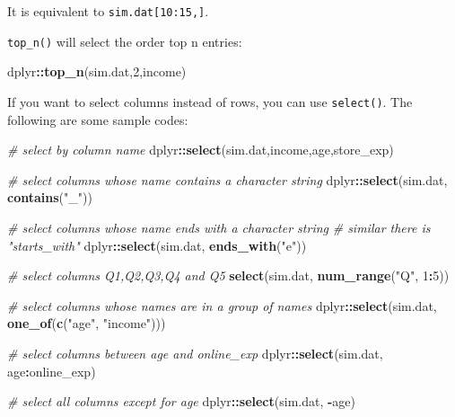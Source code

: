 \documentclass[12pt,]{krantz}
\makeatletter
\newenvironment{Shaded}{\begin{snugshade}}{\end{snugshade}}
\newcommand{\CommentTok}[1]{\textcolor[rgb]{0.37,0.37,0.37}{\textit{#1}}}
\newcommand{\DecValTok}[1]{\textcolor[rgb]{0.06,0.06,0.06}{#1}}
\newcommand{\KeywordTok}[1]{\textcolor[rgb]{0.27,0.27,0.27}{\textbf{#1}}}
\newcommand{\NormalTok}[1]{#1}
\newcommand{\OperatorTok}[1]{\textcolor[rgb]{0.43,0.43,0.43}{\textbf{#1}}}
\newcommand{\StringTok}[1]{\textcolor[rgb]{0.5,0.5,0.5}{#1}}
\newenvironment{kframe}{%
\medskip{}
\setlength{\fboxsep}{.8em}
 \def\at@end@of@kframe{}%
 \ifinner\ifhmode%
  \def\at@end@of@kframe{\end{minipage}}%
  \begin{minipage}{\columnwidth}%
 \fi\fi%
 \def\FrameCommand##1{\hskip\@totalleftmargin \hskip-\fboxsep
 \colorbox{shadecolor}{##1}\hskip-\fboxsep
     \hskip-\linewidth \hskip-\@totalleftmargin \hskip\columnwidth}%
 \MakeFramed {\advance\hsize-\width
   \@totalleftmargin\z@ \linewidth\hsize
   \@setminipage}}%
 {\par\unskip\endMakeFramed%
 \at@end@of@kframe}
\renewenvironment{Shaded}{\begin{kframe}}{\end{kframe}}
\makeatother
\begin{document}
It is equivalent to \texttt{sim.dat{[}10:15,{]}}.

\texttt{top\_n()} will select the order top n entries:

\begin{Shaded}
\begin{Highlighting}[]
\NormalTok{dplyr}\OperatorTok{::}\KeywordTok{top_n}\NormalTok{(sim.dat,}\DecValTok{2}\NormalTok{,income)}
\end{Highlighting}
\end{Shaded}

If you want to select columns instead of rows, you can use \texttt{select()}. The following are some sample codes:

\begin{Shaded}
\begin{Highlighting}[]
\CommentTok{# select by column name}
\NormalTok{dplyr}\OperatorTok{::}\KeywordTok{select}\NormalTok{(sim.dat,income,age,store_exp)}

\CommentTok{# select columns whose name contains a character string}
\NormalTok{dplyr}\OperatorTok{::}\KeywordTok{select}\NormalTok{(sim.dat, }\KeywordTok{contains}\NormalTok{(}\StringTok{"_"}\NormalTok{))}

\CommentTok{# select columns whose name ends with a character string}
\CommentTok{# similar there is "starts_with"}
\NormalTok{dplyr}\OperatorTok{::}\KeywordTok{select}\NormalTok{(sim.dat, }\KeywordTok{ends_with}\NormalTok{(}\StringTok{"e"}\NormalTok{))}

\CommentTok{# select columns Q1,Q2,Q3,Q4 and Q5}
\KeywordTok{select}\NormalTok{(sim.dat, }\KeywordTok{num_range}\NormalTok{(}\StringTok{"Q"}\NormalTok{, }\DecValTok{1}\OperatorTok{:}\DecValTok{5}\NormalTok{)) }

\CommentTok{# select columns whose names are in a group of names}
\NormalTok{dplyr}\OperatorTok{::}\KeywordTok{select}\NormalTok{(sim.dat, }\KeywordTok{one_of}\NormalTok{(}\KeywordTok{c}\NormalTok{(}\StringTok{"age"}\NormalTok{, }\StringTok{"income"}\NormalTok{)))}

\CommentTok{# select columns between age and online_exp}
\NormalTok{dplyr}\OperatorTok{::}\KeywordTok{select}\NormalTok{(sim.dat, age}\OperatorTok{:}\NormalTok{online_exp)}

\CommentTok{# select all columns except for age}
\NormalTok{dplyr}\OperatorTok{::}\KeywordTok{select}\NormalTok{(sim.dat, }\OperatorTok{-}\NormalTok{age)}
\end{Highlighting}
\end{Shaded}
\end{document}

